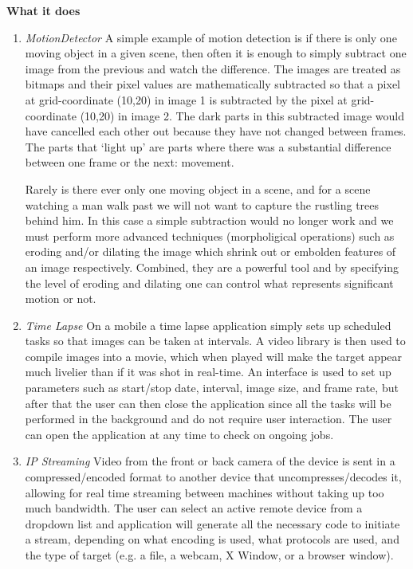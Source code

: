 \documentclass[11pt]{article} %
\begin{document}
{\large\bf What it does}
\begin{enumerate}
\item {\it MotionDetector} A simple example of motion detection is if there is only one moving object in a given scene, then often it is enough to simply subtract one image from the previous and watch the difference. The images are treated as bitmaps and their pixel values are mathematically subtracted so that a pixel at grid-coordinate (10,20) in image 1 is subtracted by the pixel at grid-coordinate (10,20) in image 2.
The dark parts in this subtracted image would have cancelled each other out because they have not changed between frames. The parts that  ‘light up’ are parts where there was a substantial difference between one frame or the next: movement.

Rarely is there ever only one moving object in a scene, and for a scene watching a man walk past we will not want to capture the rustling trees behind him. In this case a simple subtraction would no longer work and we must perform more advanced techniques (morpholigical operations) such as eroding and/or dilating the image which shrink out or embolden features of an image respectively. Combined, they are a powerful tool and by specifying the level of eroding and dilating one can control what represents significant motion or not.

\item {\it Time Lapse} On a mobile a time lapse application simply sets up scheduled tasks so that images can be taken at intervals. A video library is then used to compile images into a movie, which when played will make the target appear much livelier than if it was shot in real-time. An interface is used to set up parameters such as start/stop date, interval, image size, and frame rate, but after that the user can then close the application since all the tasks will be performed in the background and do not require user interaction. The user can open the application at any time to check on ongoing jobs.

\item {\it IP Streaming} Video from the front or back camera of the device is sent in a compressed/encoded format to another device that uncompresses/decodes it, allowing for real time streaming between machines without taking up too much bandwidth. The user can select an active remote device from a dropdown list and application will generate all the necessary code to initiate a stream, depending on what encoding is used, what protocols are used, and the type of target (e.g. a file, a webcam, X Window, or a browser window).
\end{enumerate}
\end{document}
